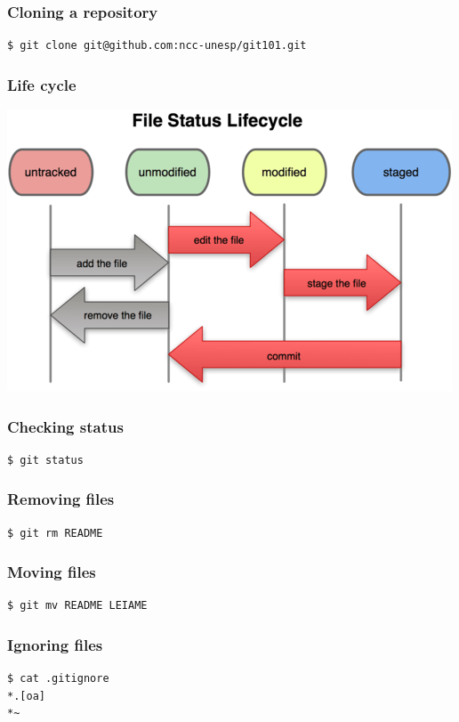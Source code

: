\documentclass{beamer}
\begin{document}
\begin{frame}[fragile]
\frametitle{Cloning a repository}
\begin{lstlisting}
$ git clone git@github.com:ncc-unesp/git101.git
\end{lstlisting}
\end{frame}

\begin{frame}
\frametitle{Life cycle}
\begin{center}
  \includegraphics[width=\textwidth,height=0.6\textheight,keepaspectratio]{imgs/life-cycle.png}
\end{center}
\end{frame}

\begin{frame}[fragile]
\frametitle{Checking status}
\begin{lstlisting}
$ git status
\end{lstlisting}
\end{frame}

\begin{frame}[fragile]
\frametitle{Removing files}
\begin{lstlisting}
$ git rm README
\end{lstlisting}
\end{frame}

\begin{frame}[fragile]
\frametitle{Moving files}
\begin{lstlisting}
$ git mv README LEIAME
\end{lstlisting}
\end{frame}

\begin{frame}[fragile]
\frametitle{Ignoring files}
\begin{lstlisting}
$ cat .gitignore
*.[oa]
*~
\end{lstlisting}
\end{frame}
\end{document}
